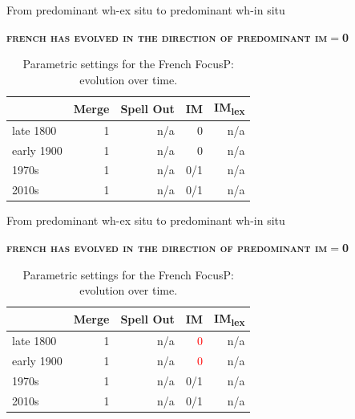 \documentclass[lesson_slides]{subfiles}
\begin{document}
\begin{frame}[c]{From predominant wh-ex situ to predominant wh-in situ}

        \textbf{\textsc{french has evolved in the direction of predominant im$=$0}} \pause

        \begin{table}[H]
        \centering
        \begin{tabular}{|l|r|r|r|r|}
        \hline
         & Merge & Spell Out & IM & IM\textsubscript{lex} \\
        \hline
        late 1800 & 1 & n/a & 0 & n/a \\
        \hline
        early 1900 & 1 & n/a & 0 & n/a \\
        \hline
        1970s & 1 & n/a & 0/1 & n/a \\
        \hline
        2010s & 1 & n/a & 0/1 & n/a \\
        \hline
        \end{tabular}
        \caption{\label{tab:samp}Parametric settings for the French FocusP: evolution over time.}
    \end{table}
  
\end{frame}
\begin{frame}[c]{From predominant wh-ex situ to predominant wh-in situ}

        \textbf{\textsc{french has evolved in the direction of predominant im$=$0}}

        \begin{table}[H]
        \centering
        \begin{tabular}{|l|r|r|r|r|}
        \hline
         & Merge & Spell Out & IM & IM\textsubscript{lex} \\
        \hline
        late 1800 & 1 & n/a & \textcolor{red}{0} & n/a \\
        \hline
        early 1900 & 1 & n/a & \textcolor{red}{0} & n/a \\
        \hline
        1970s & 1 & n/a & 0/1 & n/a \\
        \hline
        2010s & 1 & n/a & 0/1 & n/a \\
        \hline
        \end{tabular}
        \caption{\label{tab:samp}Parametric settings for the French FocusP: evolution over time.}
    \end{table}
  
\end{frame}
\end{document}
